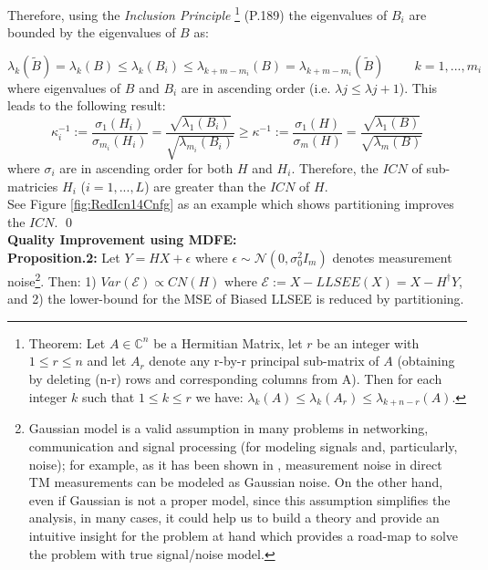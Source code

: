 Therefore, using the \emph{Inclusion Principle} \footnote{Theorem\cite{Horn}: Let $A\in \mathbb{C}^n$ be a Hermitian Matrix, let $r$ be an integer with $1\leq r\leq n$ and let $A_{r}$ denote any r-by-r principal sub-matrix of $A$ (obtaining by deleting (n-r) rows and corresponding columns from A). Then for each integer $k$ such that $1 \leq k\leq r$ we have: $\lambda_{k}(A) \leq \lambda_{k}(A_{r}) \leq \lambda_{k+n-r}(A)$.} \cite{Horn}(P.189) the eigenvalues of $B_{i}$ are bounded by the eigenvalues of $B$ as:

\begin{equation}\label{IncPrin}
\lambda_{k}(\tilde{B})=\lambda_{k}(B)\leq \lambda_{k}(B_{i}) \leq \lambda_{k+m-m_{i}}(B)=\lambda_{k+m-m_{i}}(\tilde{B})  \hspace{1cm} k=1,...,m_{i}
\end{equation}
where eigenvalues of $B$ and $B_{i}$ are in ascending order (i.e. $\lambda{j}\leq \lambda{j+1}$). This leads to the following result:
\begin{equation}\label{IncPrin}
\kappa^{-1}_{i}:=\frac{\sigma_{1}(H_{i})}{\sigma_{m_{i}}(H_{i})}=\frac{\sqrt{\lambda_{1}(B_{i})}}{\sqrt{\lambda_{m_{i}}(B_{i})}} \geq \kappa^{-1}:=\frac{\sigma_{1}(H)}{\sigma_{m}(H)}=\frac{\sqrt{\lambda_{1}(B)}}{\sqrt{\lambda_{m}(B)}}
\end{equation}
where $\sigma_{i}$ are in ascending order for both $H$ and $H_{i}$. Therefore, the $ICN$ of sub-matricies $H_{i}$ ($i=1,...,L$) are greater than the $ICN$ of $H$. \\
See Figure \ref{fig:RedIcn14Cnfg} as an example which shows partitioning improves the $ICN$. \qed \\


{\bf Quality Improvement using MDFE:} \\

\textbf{Proposition.2:} Let $Y=HX+\epsilon$ where $\epsilon \sim \mathcal{N}(0,\sigma^{2}_{0}I_{m})$ denotes measurement noise\footnote{Gaussian model is a valid assumption in many problems in networking, communication and signal processing (for modeling signals and, particularly, noise); for example, as it has been shown in \cite{QZhao}, measurement noise in direct TM measurements can be modeled as Gaussian noise. On the other hand, even if Gaussian is not a proper model, since this assumption simplifies the analysis, in many cases, it could help us to build a theory and provide an intuitive insight for the problem at hand which provides a road-map to solve the problem with true signal/noise model.}. Then: 1) $Var(\mathcal{E})\propto CN(H)$ where $\mathcal{E}:=X-LLSEE(X)=X-H^{\dagger}Y$, and 2) the lower-bound for the MSE of Biased LLSEE is reduced by partitioning.\\

